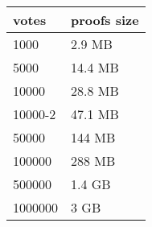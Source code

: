 \documentclass{standalone}
\begin{document}
\begin{tabular}{ll}
\hline
 votes   & proofs size   \\
\hline
 1000    & 2.9 MB        \\
 5000    & 14.4 MB       \\
 10000   & 28.8 MB       \\
 10000-2 & 47.1 MB       \\
 50000   & 144 MB        \\
 100000  & 288 MB        \\
 500000  & 1.4 GB        \\
 1000000 & 3 GB          \\
\hline
\end{tabular}
\end{document}
